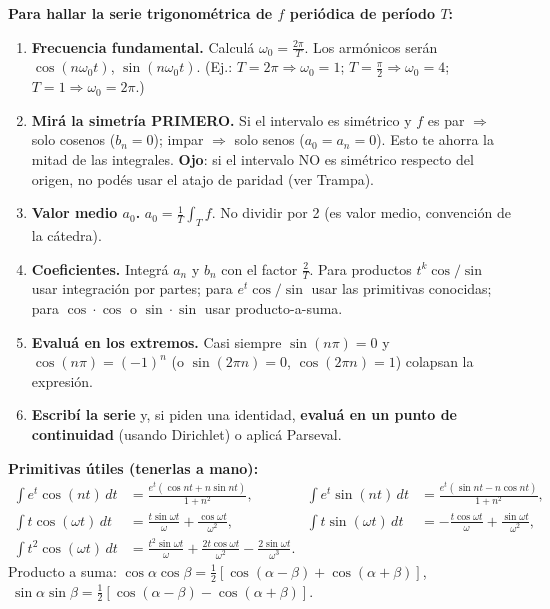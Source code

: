 \begin{receta}
\textbf{Para hallar la serie trigonométrica de $f$ periódica de período $T$:}
\begin{enumerate}
\item \textbf{Frecuencia fundamental.} Calculá $\omega_0=\frac{2\pi}{T}$. Los armónicos serán $\cos(n\omega_0 t)$, $\sin(n\omega_0 t)$. (Ej.: $T=2\pi\Rightarrow\omega_0=1$; $T=\frac\pi2\Rightarrow\omega_0=4$; $T=1\Rightarrow\omega_0=2\pi$.)
\item \textbf{Mirá la simetría PRIMERO.} Si el intervalo es simétrico y $f$ es par $\Rightarrow$ solo cosenos ($b_n=0$); impar $\Rightarrow$ solo senos ($a_0=a_n=0$). Esto te ahorra la mitad de las integrales. \textbf{Ojo}: si el intervalo NO es simétrico respecto del origen, no podés usar el atajo de paridad (ver Trampa).
\item \textbf{Valor medio $a_0$.} $a_0=\frac1T\int_T f$. No dividir por 2 (es valor medio, convención de la cátedra).
\item \textbf{Coeficientes.} Integrá $a_n$ y $b_n$ con el factor $\frac2T$. Para productos $t^k\cos/\sin$ usar integración por partes; para $e^{t}\cos/\sin$ usar las primitivas conocidas; para $\cos\cdot\cos$ o $\sin\cdot\sin$ usar producto-a-suma.
\item \textbf{Evaluá en los extremos.} Casi siempre $\sin(n\pi)=0$ y $\cos(n\pi)=(-1)^n$ (o $\sin(2\pi n)=0$, $\cos(2\pi n)=1$) colapsan la expresión.
\item \textbf{Escribí la serie} y, si piden una identidad, \textbf{evaluá en un punto de continuidad} (usando Dirichlet) o aplicá Parseval.
\end{enumerate}
\textbf{Primitivas útiles (tenerlas a mano):}
\begin{align*}
\int e^{t}\cos(nt)\,dt&=\frac{e^{t}(\cos nt+n\sin nt)}{1+n^2}, &
\int e^{t}\sin(nt)\,dt&=\frac{e^{t}(\sin nt-n\cos nt)}{1+n^2},\\
\int t\cos(\omega t)\,dt&=\frac{t\sin\omega t}{\omega}+\frac{\cos\omega t}{\omega^2}, &
\int t\sin(\omega t)\,dt&=-\frac{t\cos\omega t}{\omega}+\frac{\sin\omega t}{\omega^2},\\
\int t^2\cos(\omega t)\,dt&=\frac{t^2\sin\omega t}{\omega}+\frac{2t\cos\omega t}{\omega^2}-\frac{2\sin\omega t}{\omega^3}.
\end{align*}
Producto a suma: $\cos\alpha\cos\beta=\tfrac12[\cos(\alpha-\beta)+\cos(\alpha+\beta)]$, $\ \sin\alpha\sin\beta=\tfrac12[\cos(\alpha-\beta)-\cos(\alpha+\beta)]$.
\end{receta}

